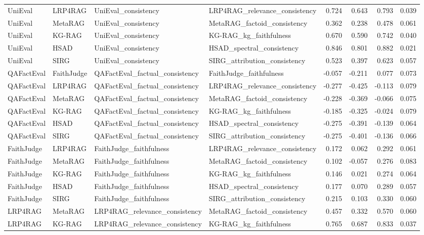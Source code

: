 \begin{table}
\begin{tabular}{llllrrrr}
UniEval & LRP4RAG & UniEval_consistency & LRP4RAG_relevance_consistency & 0.724 & 0.643 & 0.793 & 0.039 \\
UniEval & MetaRAG & UniEval_consistency & MetaRAG_factoid_consistency & 0.362 & 0.238 & 0.478 & 0.061 \\
UniEval & KG-RAG & UniEval_consistency & KG-RAG_kg_faithfulness & 0.670 & 0.590 & 0.742 & 0.040 \\
UniEval & HSAD & UniEval_consistency & HSAD_spectral_consistency & 0.846 & 0.801 & 0.882 & 0.021 \\
UniEval & SIRG & UniEval_consistency & SIRG_attribution_consistency & 0.523 & 0.397 & 0.623 & 0.057 \\
QAFactEval & FaithJudge & QAFactEval_factual_consistency & FaithJudge_faithfulness & -0.057 & -0.211 & 0.077 & 0.073 \\
QAFactEval & LRP4RAG & QAFactEval_factual_consistency & LRP4RAG_relevance_consistency & -0.277 & -0.425 & -0.113 & 0.079 \\
QAFactEval & MetaRAG & QAFactEval_factual_consistency & MetaRAG_factoid_consistency & -0.228 & -0.369 & -0.066 & 0.075 \\
QAFactEval & KG-RAG & QAFactEval_factual_consistency & KG-RAG_kg_faithfulness & -0.185 & -0.325 & -0.024 & 0.079 \\
QAFactEval & HSAD & QAFactEval_factual_consistency & HSAD_spectral_consistency & -0.275 & -0.391 & -0.139 & 0.064 \\
QAFactEval & SIRG & QAFactEval_factual_consistency & SIRG_attribution_consistency & -0.275 & -0.401 & -0.136 & 0.066 \\
FaithJudge & LRP4RAG & FaithJudge_faithfulness & LRP4RAG_relevance_consistency & 0.172 & 0.062 & 0.292 & 0.061 \\
FaithJudge & MetaRAG & FaithJudge_faithfulness & MetaRAG_factoid_consistency & 0.102 & -0.057 & 0.276 & 0.083 \\
FaithJudge & KG-RAG & FaithJudge_faithfulness & KG-RAG_kg_faithfulness & 0.146 & 0.021 & 0.274 & 0.064 \\
FaithJudge & HSAD & FaithJudge_faithfulness & HSAD_spectral_consistency & 0.177 & 0.070 & 0.289 & 0.057 \\
FaithJudge & SIRG & FaithJudge_faithfulness & SIRG_attribution_consistency & 0.215 & 0.103 & 0.330 & 0.060 \\
LRP4RAG & MetaRAG & LRP4RAG_relevance_consistency & MetaRAG_factoid_consistency & 0.457 & 0.332 & 0.570 & 0.060 \\
LRP4RAG & KG-RAG & LRP4RAG_relevance_consistency & KG-RAG_kg_faithfulness & 0.765 & 0.687 & 0.833 & 0.037 \\

\end{tabular}
\end{table}
